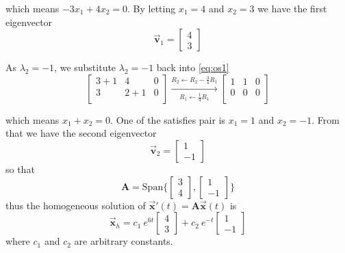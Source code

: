 \begin{solution}
    which means $-3x_1 + 4x_2 = 0$. By letting $x_1 = 4$ and $x_2 = 3$ we have the first eigenvector 
    \[
        \overrightarrow{\mathbf{v}}_1 = \begin{bmatrix}
            4 \\ 3
        \end{bmatrix}
    \]

    As $\lambda_2 = -1$, we substitute $\lambda_2 = -1$ back into \eqref{eq:os1}
    \[
        \left[
        \begin{array}{cc|c}
        3+1 & 4 & 0 \\
        3 & 2+1 & 0 \\
        \end{array}
        \right] \xrightarrow[\displaystyle R_1 \leftarrow \frac{1}{4}R_1]{\displaystyle R_2 \leftarrow R_2 - \frac{3}{4}R_1}
        \left[
        \begin{array}{cc|c}
        1 & 1 & 0 \\
        0 & 0 & 0 \\
        \end{array}
        \right]
    \]

    which means $x_1 + x_2 = 0$. One of the satisfies pair is $x_1 = 1$ and $x_2 = -1$. From that we have the second eigenvector 
    \[
        \overrightarrow{\mathbf{v}}_2 = \begin{bmatrix}
            1 \\ -1
        \end{bmatrix}
    \]
    so that
    \[
        \mathbf{A} = \text{Span} \Biggl \{ \begin{bmatrix}
            3 \\ 4
        \end{bmatrix}, \begin{bmatrix}
            1 \\ -1
        \end{bmatrix}\Biggr \}
    \]
    thus the homogeneous solution of $\overrightarrow{\mathbf{x}}'(t) = \mathbf{A}\overrightarrow{\mathbf{x}}(t)$ is 
    \begin{equation*}
        \overrightarrow{\mathbf{x}}_h = c_1 \> e^{6t} \begin{bmatrix}
            4 \\ 3
        \end{bmatrix} + c_2 \> e^{-t} \begin{bmatrix}
            1 \\ -1
        \end{bmatrix}
    \end{equation*}
    where $c_1$ and $c_2$ are arbitrary constants.


\end{solution}
